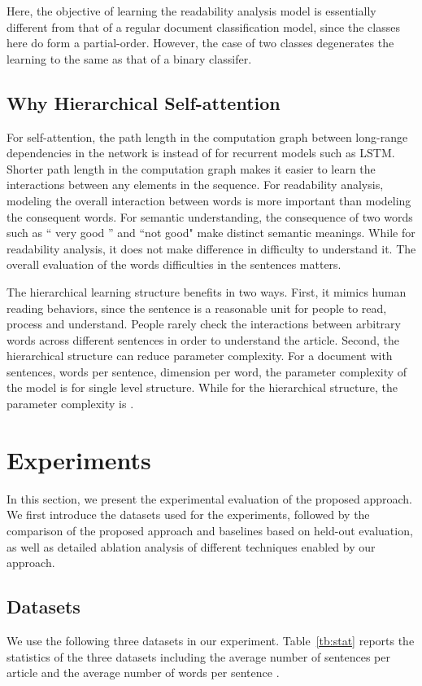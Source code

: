 \documentclass[runningheads]{llncs}
\begin{document}
Here, the objective of learning the readability analysis model is essentially different from that of a regular document classification model, since the classes here do form a partial-order. However, the case of two classes degenerates the learning to the same as that of a binary classifer.

\subsection{Why Hierarchical Self-attention}

For self-attention, the path length in the  computation graph between long-range dependencies in the network is  instead of  for recurrent models such as LSTM. Shorter path length in the computation graph makes it easier to learn the interactions between any elements in the sequence. For readability analysis, modeling the overall interaction between words is more important than modeling the consequent words. For semantic understanding, the consequence of two words such as `` very good '' and ``not good" make distinct semantic meanings.  While for readability analysis, it does not make difference in difficulty to understand it. The overall evaluation of the words difficulties in the sentences matters. 

The hierarchical learning structure benefits in two ways. First, it mimics human reading behaviors, since the sentence is a reasonable unit for people to read, process and understand. People rarely check the interactions between arbitrary words across different sentences in order to understand the article. Second, the hierarchical structure can reduce parameter complexity. For a document with  sentences,  words per sentence,  dimension per word, the parameter complexity of the model is  for single level structure. While for the hierarchical structure, the parameter complexity is .
 \section{Experiments}

In this section, we present the experimental evaluation of the proposed approach.
We first introduce the datasets used for the experiments, followed by the comparison of the proposed approach and baselines based on held-out evaluation, as well as detailed ablation analysis of different techniques enabled by our approach.

\subsection{Datasets}
We use the following three datasets in our experiment. Table~\ref{tb:stat} reports the statistics of the three datasets including the average number of sentences per article  and the average number of words per sentence .
\end{document}
